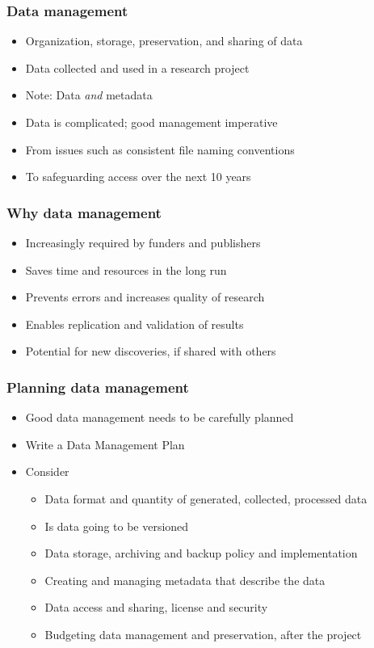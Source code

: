 \documentclass{beamer}
\begin{document}
\begin{frame}
  \frametitle{Data management}
  
  \begin{itemize}
  \item Organization, storage, preservation, and sharing of data 
  \item Data collected and used in a research project 
  \item Note: Data \emph{and} metadata
  \item Data is complicated; good management imperative
  \item From issues such as consistent file naming conventions
  \item To safeguarding access over the next 10 years
  \end{itemize}
\end{frame}

\begin{frame}
  \frametitle{Why data management}
  
  \begin{itemize}
    \item Increasingly required by funders and publishers
    \item Saves time and resources in the long run
    \item Prevents errors and increases quality of research
    \item Enables replication and validation of results
    \item Potential for new discoveries, if shared with others
  \end{itemize}
\end{frame}

\begin{frame}
  \frametitle{Planning data management}
  
  \begin{itemize}
  \item Good data management needs to be carefully planned
  \item Write a Data Management Plan
  \item Consider
  \begin{itemize}
    \item Data format and quantity of generated, collected, processed data
    \item Is data going to be versioned
    \item Data storage, archiving and backup policy and implementation
    \item Creating and managing metadata that describe the data
    \item Data access and sharing, license and security
    \item Budgeting data management and preservation, after the project
  \end{itemize}
  \end{itemize}
\end{frame}
\end{document}
